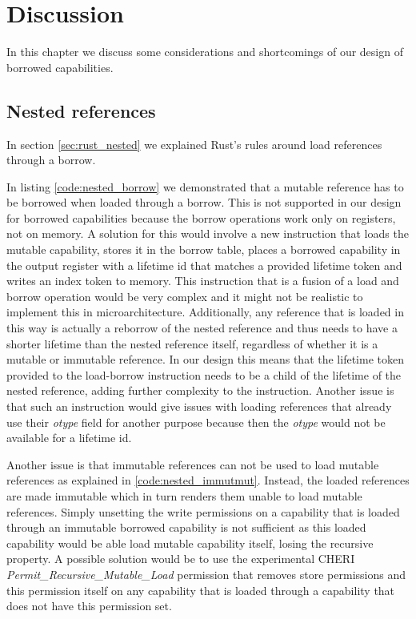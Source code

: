 \chapter{Discussion}
\label{chap:discussion}
In this chapter we discuss some considerations and shortcomings of our design of borrowed capabilities.

\section{Nested references}
In section \ref{sec:rust_nested} we explained Rust's rules around load references through a borrow.

In listing \ref{code:nested_borrow} we demonstrated that a mutable reference has to be borrowed when loaded through a borrow.
This is not supported in our design for borrowed capabilities because the borrow operations work only on registers, not on memory.
A solution for this would involve a new instruction that loads the mutable capability, stores it in the borrow table, places a borrowed capability in the output register with a lifetime id that matches a provided lifetime token and writes an index token to memory.
This instruction that is a fusion of a load and borrow operation would be very complex and it might not be realistic to implement this in microarchitecture.
Additionally, any reference that is loaded in this way is actually a reborrow of the nested reference and thus needs to have a shorter lifetime than the nested reference itself, regardless of whether it is a mutable or immutable reference.
In our design this means that the lifetime token provided to the load-borrow instruction needs to be a child of the lifetime of the nested reference, adding further complexity to the instruction.
Another issue is that such an instruction would give issues with loading references that already use their \textit{otype} field for another purpose because then the \textit{otype} would not be available for a lifetime id.

Another issue is that immutable references can not be used to load mutable references as explained in \ref{code:nested_immutmut}.
Instead, the loaded references are made immutable which in turn renders them unable to load mutable references.
Simply unsetting the write permissions on a capability that is loaded through an immutable borrowed capability is not sufficient as this loaded capability would be able load mutable capability itself, losing the recursive property.
A possible solution would be to use the experimental CHERI \textit{Permit\_Recursive\_Mutable\_Load} permission that removes store permissions and this permission itself on any capability that is loaded through a capability that does not have this permission set.

